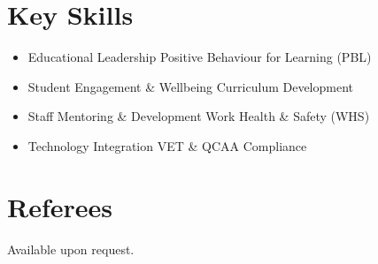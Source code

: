 \documentclass[11pt,a4paper]{article}
\begin{document}
\section*{Key Skills}
\begin{itemize}
    \item Educational Leadership \hfill Positive Behaviour for Learning (PBL)
    \item Student Engagement \& Wellbeing \hfill Curriculum Development
    \item Staff Mentoring \& Development \hfill Work Health \& Safety (WHS)
    \item Technology Integration \hfill VET \& QCAA Compliance
\end{itemize}

\section*{Referees}
Available upon request.
\end{document}
